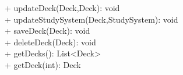 { 
    + updateDeck(Deck,Deck): void\\
    + updateStudySystem(Deck,StudySystem): void\\
    + saveDeck(Deck): void\\
    + deleteDeck(Deck): void\\
    + getDecks(): List<Deck>\\
    + getDeck(int): Deck\\
}{}
